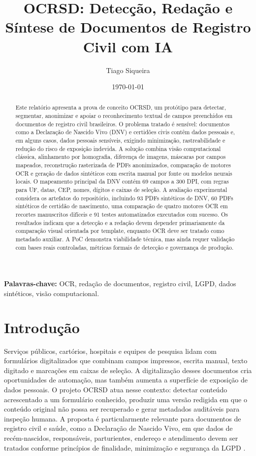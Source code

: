 \documentclass[12pt,a4paper]{article}
\title{\textbf{OCRSD: Detecção, Redação e Síntese de Documentos de Registro Civil com IA}}
\author{Tiago Siqueira}
\date{\small \today}
\begin{document}
\maketitle

\begin{abstract}
Este relatório apresenta a prova de conceito OCRSD, um protótipo para detectar, segmentar, anonimizar e apoiar o reconhecimento textual de campos preenchidos em documentos de registro civil brasileiros. O problema tratado é sensível: documentos como a Declaração de Nascido Vivo (DNV) e certidões civis contêm dados pessoais e, em alguns casos, dados pessoais sensíveis, exigindo minimização, rastreabilidade e redução do risco de exposição indevida. A solução combina visão computacional clássica, alinhamento por homografia, diferença de imagens, máscaras por campos mapeados, reconstrução rasterizada de PDFs anonimizados, comparação de motores OCR e geração de dados sintéticos com escrita manual por fonte ou modelos neurais locais. O mapeamento principal da DNV contém 69 campos a 300 DPI, com regras para UF, datas, CEP, nomes, dígitos e caixas de seleção. A avaliação experimental considera os artefatos do repositório, incluindo 93 PDFs sintéticos de DNV, 60 PDFs sintéticos de certidão de nascimento, uma comparação de quatro motores OCR em recortes manuscritos difíceis e 91 testes automatizados executados com sucesso. Os resultados indicam que a detecção e a redação devem depender primariamente da comparação visual orientada por template, enquanto OCR deve ser tratado como metadado auxiliar. A PoC demonstra viabilidade técnica, mas ainda requer validação com bases reais controladas, métricas formais de detecção e governança de produção.
\end{abstract}

\textbf{Palavras-chave:} OCR, redação de documentos, registro civil, LGPD, dados sintéticos, visão computacional.

\tableofcontents

\section{Introdução}
\label{sec:introducao}

Serviços públicos, cartórios, hospitais e equipes de pesquisa lidam com formulários digitalizados que combinam campos impressos, escrita manual, texto digitado e marcações em caixas de seleção. A digitalização desses documentos cria oportunidades de automação, mas também aumenta a superfície de exposição de dados pessoais. O projeto OCRSD atua nesse contexto: detectar conteúdo acrescentado a um formulário conhecido, produzir uma versão redigida em que o conteúdo original não possa ser recuperado e gerar metadados auditáveis para inspeção humana. A proposta é particularmente relevante para documentos de registro civil e saúde, como a Declaração de Nascido Vivo, em que dados de recém-nascidos, responsáveis, parturientes, endereço e atendimento devem ser tratados conforme princípios de finalidade, minimização e segurança da LGPD \cite{brasil2018lgpd}.
\end{document}
